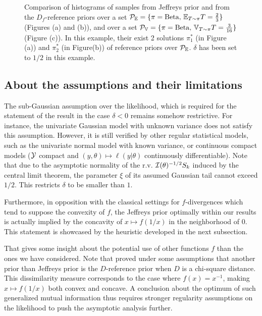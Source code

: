 \begin{figure}
{    }
    \caption{Comparison of histograms of samples from Jeffreys prior and from the $D_f$-reference priors over a set $\mathcal{P}_{\mathbb{E}}=\{\pi=\mathrm{Beta},\,\mathbb{E}_{T\sim\pi}T=\frac{2}{3}\}$ (Figures (a) and (b)), and over a set $\mathcal{P}_{\mathbb{V}}=\{\pi=\mathrm{Beta},\,\mathbb{V}_{T\sim\pi}T=\frac{3}{16}\}$ (Figure (c)). In this example, their exist 2 solutions $\pi_1^\ast$ (in Figure (a)) and $\pi_2^\ast$ (in Figure(b)) of reference priors over $\mathcal{P}_{\mathbb{E}}$. $\delta$ has been set to $1/2$ in this example.}
    \label{fig:exbeta}
\end{figure}





    \subsection{About the assumptions and their limitations}

    The sub-Gaussian assumption over the likelihood, which is required for the statement of the result in the case $\delta<0$
    remains somehow restrictive. For instance,
    the univariate Gaussian model with unknown variance does not satisfy this assumption. 
    However, 
    it is still verified by other regular statistical models, such as the
     univariate normal model with known variance, or continuous compact models ($\mathcal{Y}$ compact and $(y,\theta)\mapsto\ell(y|\theta)$ continuously differentiable). {Note that due to the asymptotic normality of the r.v. $\mathcal{I}(\theta)^{-1/2}S_k$ induced by the central limit theorem, the parameter $\xi$ of its assumed Gaussian tail cannot exceed $1/2$. This restricts $\delta$ to be smaller than $1$.}

Furthermore, %
in opposition with the classical settings for $f$-divergences which tend to suppose the convexity of $f$, the Jeffreys prior optimally within our results is actually implied by the concavity of $x\mapsto f(1/x)$ in the neighborhood of $0$.
This statement is showcased by the heuristic developed in the next subsection.

That gives some insight about the potential use of other functions $f$ than the ones we have considered.
Note that \citet{clarke_reference_1997} proved under some assumptions that another prior than Jeffreys prior is the $D$-reference prior when $D$ is a chi-square distance. This dissimilarity measure corresponds to the case where $f(x)=x^{-1}$, making $x\mapsto f(1/x)$ both convex and concave. 
A conclusion about the optimum of such generalized
mutual information thus requires stronger regularity assumptions on the likelihood to push
the asymptotic analysis further. %

